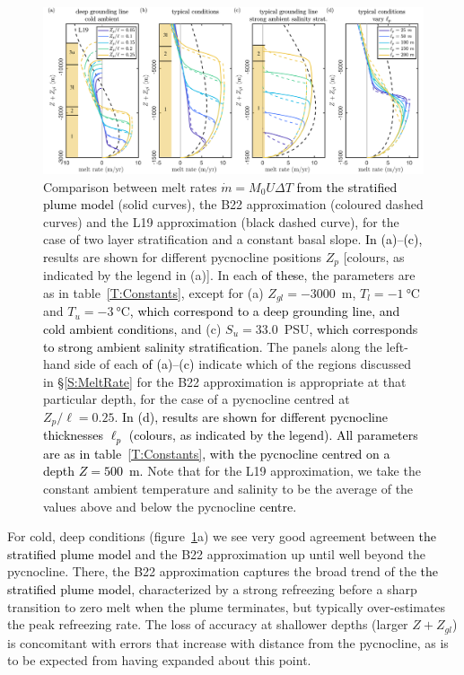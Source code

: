 \documentclass[openacc]{rsproca_new}%
\newcommand{\red}[1]{{\color{red} #1}}
\newcommand{\blue}[1]{{\color{blue} #1}}
\newcommand{\rout}[1]{\red{\st{#1}}}\newcommand{\ab}[1]{\textcolor{Green}{#1}}\newcommand{\about}[1]{\textcolor{Cyan}{\sout{#1}}}
\renewcommand{\rout}[1]{{}} %
\renewcommand{\blue}[1]{{\textcolor{black}{#1}}} %
\renewcommand{\red}[1]{{}} %
\begin{document}
\begin{figure}
\centering
\includegraphics[width = \textwidth]{./make_plots/plots/figure7.pdf}
\caption{Comparison between \rout{numerically obtained }melt rates $\dot{m}= M_0 U \Delta T$ \blue{from the stratified plume model} (solid curves), the B22 approximation (coloured dashed curves) and the L19 approximation (black dashed curve), for the case of two layer stratification and a constant basal slope. \blue{In (a)--(c),} \rout{R}\blue{r}esults are shown for different pycnocline positions $Z_p$ [colours, as indicated by the legend in (a)]. In each \rout{case}\blue{of these}, the parameters are as in table~\ref{T:Constants}, except for (a) $Z_{gl} = -3000$~m, $T_l = -1~\si{\celsius}$ and $T_u = -3~\si{\celsius}$\blue{, which correspond to a deep grounding line, and cold ambient conditions,} and (c)  $S_u = 33.0$~PSU\blue{, which corresponds to strong ambient salinity stratification}.  The panels along the left-hand side of each \rout{subplot}\blue{of (a)--(c)} indicate which of the regions discussed in \S\ref{S:MeltRate} for the B22 approximation is appropriate at that particular depth, for the case of a pycnocline centred at $Z_p/\ell = 0.25$. \blue{In (d), results are shown for different pycnocline thicknesses $\ell_p$ (colours, as indicated by the legend). All parameters are as in table~\ref{T:Constants}, with the pycnocline centred on a depth $Z = 500$~m.} Note that for the L19 approximation, we take the constant ambient temperature and salinity to be the average of the values above and below the pycnocline \blue{centre}.}\label{fig:Numerics:PycnoclinePosition}
\end{figure}

For cold, deep conditions (figure~\ref{fig:Numerics:PycnoclinePosition}a) we see very good agreement between \blue{the stratified plume model}\rout{numerically obtained melt rates} and the B22 approximation up until well beyond the pycnocline. There, the B22 approximation captures the broad trend of the \blue{the stratified plume model}\rout{numerical solutions}, characterized by a strong refreezing before a sharp transition to zero melt when the plume terminates, but typically over-estimates the peak refreezing rate. The loss of accuracy at shallower depths (larger $Z + Z_{gl}$) is concomitant with errors that increase with distance from the pycnocline, as is to be expected from having expanded about this point.
\end{document}
